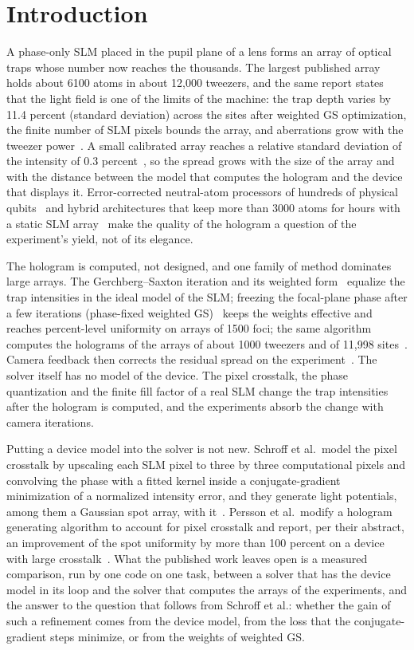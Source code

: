 \section{Introduction}\label{sec:intro}

A phase-only SLM placed in the pupil plane of a lens forms an array of optical traps whose number now reaches the thousands. The largest
published array holds about 6100 atoms in about 12,000 tweezers, and the same report states that the light field is one of the limits of
the machine: the trap depth varies by 11.4 percent (standard deviation) across the sites after weighted GS optimization, the finite number of SLM pixels
bounds the array, and aberrations grow with the tweezer power~\cite{manetsch}. A small calibrated array reaches a relative standard deviation
of the intensity of 0.3 percent~\cite{chew}, so the spread grows with the size of the array and with the distance between the model that computes the hologram
and the device that displays it. Error-corrected neutral-atom processors of hundreds of physical qubits~\cite{bluvstein} and hybrid architectures that keep more than 3000 atoms for hours with a
static SLM array~\cite{chiu} make the quality of the hologram a question of the experiment's yield, not of its elegance.

The hologram is computed, not designed, and one family of method dominates large arrays. The Gerchberg--Saxton iteration and its weighted form~\cite{dileonardo}
equalize the trap intensities in the ideal model of the SLM; freezing the focal-plane phase after a few iterations (phase-fixed weighted GS)~\cite{kim2019} keeps the weights effective and reaches
percent-level uniformity on arrays of 1500 foci; the same algorithm computes the holograms of the arrays of about 1000 tweezers and of 11,998 sites~\cite{ebadi,manetsch}. Camera feedback then
corrects the residual spread on the experiment~\cite{nogrette,kim2019}. The solver itself has no model of the device. The pixel crosstalk, the phase quantization and the finite fill factor of a real SLM change the trap
intensities after the hologram is computed, and the experiments absorb the change with camera iterations.

Putting a device model into the solver is not new. Schroff et al.\ model the pixel crosstalk by upscaling each SLM pixel to three by three computational pixels and convolving the phase with a fitted kernel inside a conjugate-gradient minimization of a normalized intensity error, and they generate light potentials, among them a Gaussian spot array, with it~\cite{schroff}. Persson et al.\ modify a hologram generating algorithm to account for pixel crosstalk and report, per their abstract, an improvement of the spot uniformity by more than 100 percent on a device with large crosstalk~\cite{persson}. What the published work leaves open is a measured comparison, run by one code on one task, between a solver that has the device model in its loop and the solver that computes the arrays of the experiments, and the answer to the question that follows from Schroff et al.: whether the gain of such a refinement comes from the device model, from the loss that the conjugate-gradient steps minimize, or from the weights of weighted GS.

